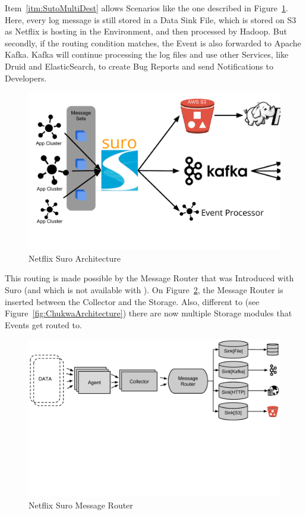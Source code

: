 Item~\ref{itm:SutoMultiDest} allows Scenarios like the one described in Figure~\ref{fig:SuroArchitecture}. 
Here, every log message is still stored in a Data Sink File, which is stored on \aws S3 as Netflix is hosting in the \aws Environment, and then processed by Hadoop. But secondly, if the routing condition matches, the Event is also forwarded to Apache Kafka. Kafka will continue processing the log files and use other Services, like Druid and ElasticSearch, to create Bug Reports and send Notifications to Developers.
\begin{figure}[hbt]
  \centering
  \includegraphics[width=\linewidth,clip=true,trim=5mm 2cm 0 5mm]{images/NetflixSuro}
  \caption{Netflix Suro Architecture~\cite{Bae2013, Harris2013}}
  \label{fig:SuroArchitecture}
\end{figure}


This routing is made possible by the Message Router that was Introduced with Suro (and which is not available with \chuk). On Figure~\ref{fig:SuroMessageRouter}, the Message Router is inserted between the Collector and the Storage. Also, different to \chuk (see Figure~\ref{fig:ChukwaArchitecture}) there are now multiple Storage modules that Events get routed to.
\begin{figure}[hbt]
  \centering
  \includegraphics[width=\linewidth,clip=true,trim=0 75mm 0 0]{images/SuroMessageRouter}
  \caption{Netflix Suro Message Router~\cite{Bae2013}}
  \label{fig:SuroMessageRouter}
\end{figure}


